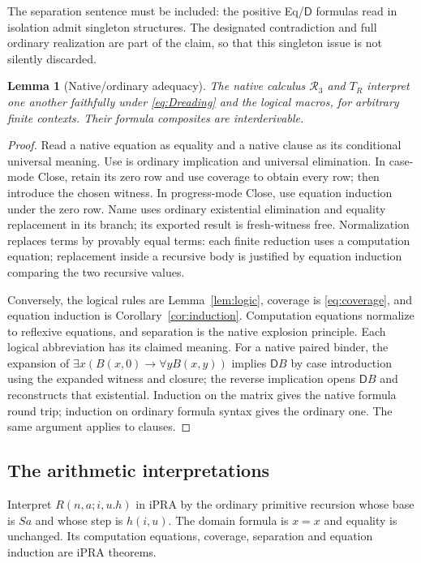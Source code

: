 \documentclass[11pt,letterpaper]{article}
\newtheorem{lemma}[theorem]{Lemma}
\theoremstyle{definition}\newtheorem{definition}[theorem]{Definition}
\theoremstyle{remark}\newtheorem{remark}[theorem]{Remark}
\newcommand{\RN}{\mathcal R_3}
\newcommand{\DD}{\mathsf D}
\begin{document}
The separation sentence must be included: the positive Eq/$\DD$
formulas read in isolation admit singleton structures. The
designated contradiction and full ordinary realization are
part of the claim, so that this singleton issue is not silently
discarded.

\begin{lemma}[Native/ordinary adequacy]\label{lem:adequacy}
The native calculus $\RN$ and $T_R$ interpret one another
faithfully under \eqref{eq:Dreading} and the logical macros,
for arbitrary finite contexts. Their formula composites are
interderivable.
\end{lemma}
\begin{proof}
Read a native equation as equality and a native clause as its
conditional universal meaning. Use is ordinary implication and
universal elimination. In case-mode Close, retain its zero row
and use coverage to obtain every row; then introduce the chosen
witness. In progress-mode Close, use equation induction under
the zero row. Name uses ordinary existential elimination and
equality replacement in its branch; its exported result is
fresh-witness free. Normalization replaces terms by provably
equal terms: each finite reduction uses a computation equation;
replacement inside a recursive body is justified by equation
induction comparing the two recursive values.

Conversely, the logical rules are Lemma~\ref{lem:logic},
coverage is \eqref{eq:coverage}, and equation induction is
Corollary~\ref{cor:induction}. Computation equations normalize
to reflexive equations, and separation is the native explosion
principle. Each logical abbreviation has its claimed meaning.
For a native paired binder, the expansion of
$\exists x(B(x,0)\to\forall yB(x,y))$ implies $\DD B$ by
case introduction using the expanded witness and closure;
the reverse implication opens $\DD B$ and reconstructs that
existential. Induction on the matrix gives the native formula
round trip; induction on ordinary formula syntax gives the
ordinary one. The same argument applies to clauses.
\end{proof}

\subsection{The arithmetic interpretations}
Interpret $R(n,a;i,u.h)$ in iPRA by the ordinary primitive
recursion whose base is $Sa$ and whose step is $h(i,u)$.
The domain formula is $x=x$ and equality is unchanged.
Its computation equations, coverage, separation and equation
induction are iPRA theorems.
\end{document}
